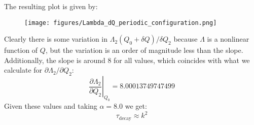 \documentclass[reqno]{article}
\begin{document}
The resulting plot is given by:
\begin{figure}[h]
    \centering
    \texttt{[image: figures/Lambda\_dQ\_periodic\_configuration.png]}
\end{figure}
Clearly there is some variation in $\Lambda_2(Q_0 + \delta Q) / \delta Q_2$ because $\Lambda$ is a nonlinear function of $Q$, but the variation is an order of magnitude less than the slope.
Additionally, the slope is around 8 for all values, which coincides with what we calculate for $\partial \Lambda_2 / \partial Q_2$:
\begin{equation}
    \left. \frac{\partial \Lambda_2}{\partial Q_2} \right|_{Q_0} = 8.00013749747499
\end{equation}
Given these values and taking $\alpha = 8.0$ we get:
\begin{equation}
    \tau_\text{decay} \approx k^2
\end{equation}
\end{document}

